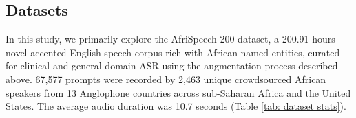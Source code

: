 \documentclass{INTERSPEECH2023}
\begin{document}










\subsection{Datasets}
In this study, we primarily explore the AfriSpeech-200 dataset, a 200.91 hours novel accented English speech corpus rich with African-named entities, curated for clinical and general domain ASR using the augmentation process described above. 67,577 prompts were recorded by 2,463 unique crowdsourced African speakers from 13 Anglophone countries across sub-Saharan Africa and the United States. The average audio duration was 10.7 seconds (Table \ref{tab: dataset stats}).

\end{document}
